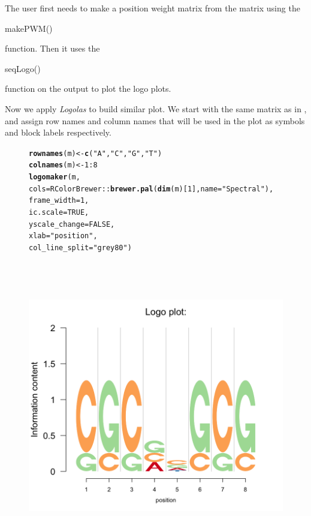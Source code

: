 \documentclass[12pt]{article}\usepackage[]{graphicx}\usepackage[usenames,dvipsnames]{color}
\makeatletter
\newcommand{\hlnum}[1]{\textcolor[rgb]{0.686,0.059,0.569}{#1}}%
\newcommand{\hlstr}[1]{\textcolor[rgb]{0.192,0.494,0.8}{#1}}%
\newcommand{\hlopt}[1]{\textcolor[rgb]{0,0,0}{#1}}%
\newcommand{\hlstd}[1]{\textcolor[rgb]{0.345,0.345,0.345}{#1}}%
\newcommand{\hlkwb}[1]{\textcolor[rgb]{0.69,0.353,0.396}{#1}}%
\newcommand{\hlkwc}[1]{\textcolor[rgb]{0.333,0.667,0.333}{#1}}%
\newcommand{\hlkwd}[1]{\textcolor[rgb]{0.737,0.353,0.396}{\textbf{#1}}}%
\newenvironment{kframe}{%
 \def\at@end@of@kframe{}%
 \ifinner\ifhmode%
  \def\at@end@of@kframe{\end{minipage}}%
  \begin{minipage}{\columnwidth}%
 \fi\fi%
 \def\FrameCommand##1{\hskip\@totalleftmargin \hskip-\fboxsep
 \colorbox{shadecolor}{##1}\hskip-\fboxsep
     \hskip-\linewidth \hskip-\@totalleftmargin \hskip\columnwidth}%
 \MakeFramed {\advance\hsize-\width
   \@totalleftmargin\z@ \linewidth\hsize
   \@setminipage}}%
 {\par\unskip\endMakeFramed%
 \at@end@of@kframe}
\newenvironment{knitrout}{}{} %
\newcommand{\Logolas}{\textit{Logolas}}
\makeatother
\begin{document}
The user first needs to make a position weight matrix from the matrix using the \begin{verb} makePWM() \end{verb} function. Then it uses the \begin{verb} seqLogo() \end{verb} function on the output to plot the logo plots.

\newpage

Now we apply \Logolas{} to build similar plot. We start with the same matrix as in , and assign row names and column names that will be used in the plot as symbols and block labels respectively.

\begin{figure}[h]
\begin{center}
\begin{knitrout}
\color{fgcolor}\begin{kframe}
\begin{alltt}
\hlkwd{rownames}\hlstd{(m)} \hlkwb{<-} \hlkwd{c}\hlstd{(}\hlstr{"A"}\hlstd{,} \hlstr{"C"}\hlstd{,} \hlstr{"G"}\hlstd{,} \hlstr{"T"}\hlstd{)}
\hlkwd{colnames}\hlstd{(m)} \hlkwb{<-} \hlnum{1}\hlopt{:}\hlnum{8}
\hlkwd{logomaker}\hlstd{(m,}
          \hlkwc{cols}\hlstd{= RColorBrewer}\hlopt{::}\hlkwd{brewer.pal}\hlstd{(}\hlkwd{dim}\hlstd{(m)[}\hlnum{1}\hlstd{],}\hlkwc{name} \hlstd{=}\hlstr{"Spectral"}\hlstd{),}
          \hlkwc{frame_width} \hlstd{=} \hlnum{1}\hlstd{,}
          \hlkwc{ic.scale} \hlstd{=} \hlnum{TRUE}\hlstd{,}
          \hlkwc{yscale_change}\hlstd{=}\hlnum{FALSE}\hlstd{,}
          \hlkwc{xlab}\hlstd{=}\hlstr{"position"}\hlstd{,}
          \hlkwc{col_line_split} \hlstd{=} \hlstr{"grey80"}\hlstd{)}
\end{alltt}
\end{kframe}
\includegraphics[width=6in,height=5in]{figure/logolas_use-1} 

\end{knitrout}
\end{center}
\end{figure}
\end{document}

